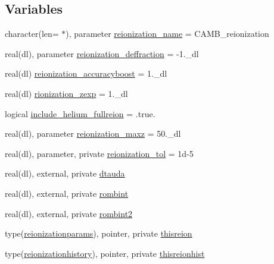 \subsection*{Variables}
\begin{DoxyCompactItemize}
\item 
character(len= $\ast$), parameter \mbox{\hyperlink{namespacereionization_a0f6786ae38db76cf41888ab5184a33e3}{reionization\+\_\+name}} = \textquotesingle{}C\+A\+M\+B\+\_\+reionization\textquotesingle{}
\item 
real(dl), parameter \mbox{\hyperlink{namespacereionization_a524cb51bf4f9b20d0d3e3be38d351411}{reionization\+\_\+deffraction}} = -\/1.\+\_\+dl
\item 
real(dl) \mbox{\hyperlink{namespacereionization_a277cddc498b57445702ef3b7301c1a0d}{reionization\+\_\+accuracyboost}} = 1.\+\_\+dl
\item 
real(dl) \mbox{\hyperlink{namespacereionization_a55530d3d422131a11f47a02e17e4aba3}{rionization\+\_\+zexp}} = 1.\+\_\+dl
\item 
logical \mbox{\hyperlink{namespacereionization_abef718177b8ea5ca6c7ee8d1c78e60c6}{include\+\_\+helium\+\_\+fullreion}} = .true.
\item 
real(dl), parameter \mbox{\hyperlink{namespacereionization_a5631e22e02e0694f1813b80cdd6004c1}{reionization\+\_\+maxz}} = 50.\+\_\+dl
\item 
real(dl), parameter, private \mbox{\hyperlink{namespacereionization_a4d46e2413c850ed23c74c3808d8ac06b}{reionization\+\_\+tol}} = 1d-\/5
\item 
real(dl), external, private \mbox{\hyperlink{namespacereionization_a51d090041c100fe2820d487b4f95146d}{dtauda}}
\item 
real(dl), external, private \mbox{\hyperlink{namespacereionization_adb3b9c977f29d4636fa9cf724efd5979}{rombint}}
\item 
real(dl), external, private \mbox{\hyperlink{namespacereionization_a415cf31bf0d6b1564808bbf7ee0b2c85}{rombint2}}
\item 
type(\mbox{\hyperlink{structreionization_1_1reionizationparams}{reionizationparams}}), pointer, private \mbox{\hyperlink{namespacereionization_a3cd065cf1b3c5c33363c2d7e5d2443ba}{thisreion}}
\item 
type(\mbox{\hyperlink{structreionization_1_1reionizationhistory}{reionizationhistory}}), pointer, private \mbox{\hyperlink{namespacereionization_afc2b645c62db796865419a767ad68a98}{thisreionhist}}
\end{DoxyCompactItemize}


